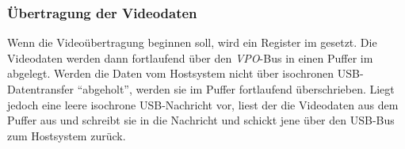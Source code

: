 \subsubsection{Übertragung der Videodaten}
Wenn die Videoübertragung beginnen soll, wird ein Register im \saa{} gesetzt.
Die Videodaten werden dann fortlaufend über den \emph{VPO}-Bus in einen Puffer im \stk{} abgelegt.
Werden die Daten vom Hostsystem nicht über isochronen USB-Datentransfer "`abgeholt"', werden sie im Puffer fortlaufend überschrieben.
Liegt jedoch eine leere isochrone USB-Nachricht vor, liest der \stk{} die Videodaten aus dem Puffer aus und schreibt sie in die Nachricht und schickt jene über den USB-Bus zum Hostsystem zurück.